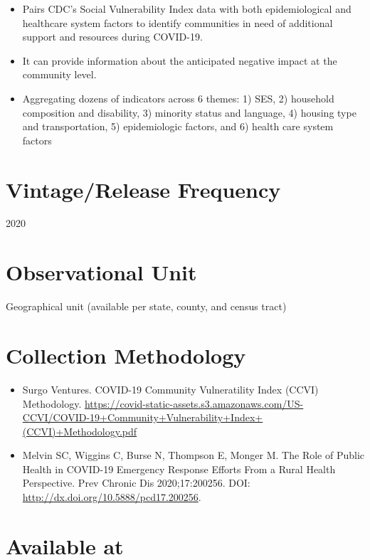 \documentclass[
]{book}
\providecommand{\tightlist}{%
  \setlength{\itemsep}{0pt}\setlength{\parskip}{0pt}}
\begin{document}
\begin{itemize}
\tightlist
\item
  Pairs CDC's Social Vulnerability Index data with both epidemiological and healthcare system factors to identify communities in need of additional support and resources during COVID-19.
\item
  It can provide information about the anticipated negative impact at the community level.
\item
  Aggregating dozens of indicators across 6 themes: 1) SES, 2) household composition and disability, 3) minority status and language, 4) housing type and transportation, 5) epidemiologic factors, and 6) health care system factors
\end{itemize}

\hypertarget{vintagerelease-frequency-21}{%
\section{Vintage/Release Frequency}\label{vintagerelease-frequency-21}}

2020

\hypertarget{observational-unit-21}{%
\section{Observational Unit}\label{observational-unit-21}}

Geographical unit (available per state, county, and census tract)

\hypertarget{collection-methodology-21}{%
\section{Collection Methodology}\label{collection-methodology-21}}

\begin{itemize}
\tightlist
\item
  Surgo Ventures. COVID-19 Community Vulneratility Index (CCVI) Methodology. \url{https://covid-static-assets.s3.amazonaws.com/US-CCVI/COVID-19+Community+Vulnerability+Index+(CCVI)+Methodology.pdf}
\item
  Melvin SC, Wiggins C, Burse N, Thompson E, Monger M. The Role of Public Health in COVID-19 Emergency Response Efforts From a Rural Health Perspective. Prev Chronic Dis 2020;17:200256. DOI: \url{http://dx.doi.org/10.5888/pcd17.200256}.
\end{itemize}

\hypertarget{available-at-21}{%
\section{Available at}\label{available-at-21}}
\end{document}
